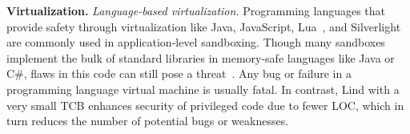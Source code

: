 \textbf{Virtualization.}
\textit{Language-based virtualization.}
Programming languages that provide safety through virtualization like
Java, JavaScript, Lua~\cite{Lua}, and
Silverlight~\cite{Silverlight} are commonly used in application-level
sandboxing. 
%
%
%
Though many sandboxes implement the bulk of standard libraries in
memory-safe languages like Java or C\#, flaws in this code can
still pose a threat~\cite{JavaBugs, Java-Lessons}. 
Any bug or failure in a programming language virtual
machine is usually fatal. In contrast, Lind with a very small TCB
enhances security of privileged code due to fewer LOC, which in 
turn reduces the number of potential bugs or weaknesses. %


